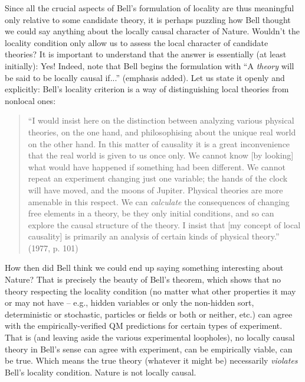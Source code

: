 \documentclass[12pt]{article}
\begin{document}
Since all the crucial aspects of Bell's formulation of locality are
thus meaningful only relative to some candidate theory, it is perhaps 
puzzling how Bell thought we could
say anything about the locally causal character of Nature.  Wouldn't
the locality condition only allow us to assess the local character of
candidate theories?  It is important to understand that the
answer is essentially (at least initially):  Yes!  Indeed, note that
Bell begins the formulation with ``A \emph{theory} will be said to be 
locally causal if...'' (emphasis added).   Let us state it openly and
explicitly:  Bell's locality criterion is a way of distinguishing
local theories from nonlocal ones:  
\begin{quote}
``I would insist here on the distinction
between analyzing various physical theories, on the one hand, and
philosophising about the unique real world on the other hand.  In this
matter of causality it is a great inconvenience that the real world is
given to us once only.  We cannot know [by looking] what would have 
happened if something had been different.  We cannot repeat an
experiment changing just one variable; the hands of the clock will
have moved, and the moons of Jupiter.   Physical 
theories are more amenable in this respect.  We can \emph{calculate}
the consequences of changing free elements in a theory, be they only
initial conditions, and so can explore the causal 
structure of the theory.  I insist that [my concept of local causality]
is primarily an analysis of certain kinds of physical theory.''
(1977, p. 101)
\end{quote}
How then did Bell think we could end up saying something interesting
about Nature?  That is precisely the beauty of Bell's theorem, which
shows that no theory respecting the locality condition (no matter what
other properties it may or may not have -- e.g., hidden variables or
only the non-hidden sort, deterministic or stochastic, particles or
fields or both or neither, etc.) can agree with the
empirically-verified QM predictions for certain types of experiment.
That is (and leaving aside the various experimental loopholes), no 
locally causal theory in Bell's sense
can agree with experiment, can be empirically viable, can be
true.  Which means the true theory (whatever it might be) necessarily
\emph{violates} Bell's locality condition.  Nature is not locally
causal.%
\end{document}
